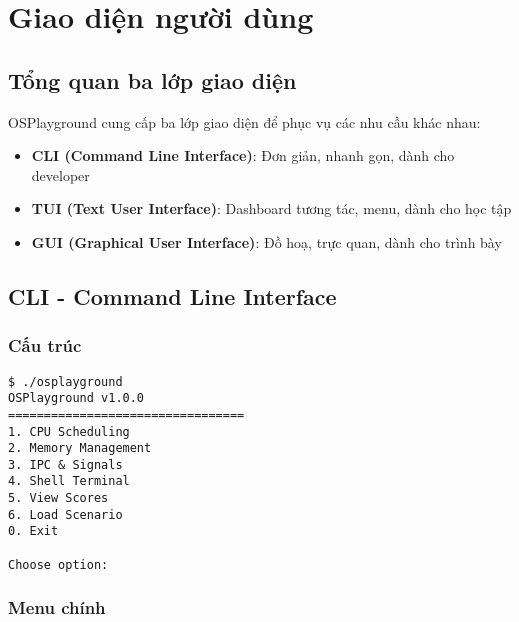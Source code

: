 
\chapter{Giao diện người dùng}
\label{ch:ui}

\section{Tổng quan ba lớp giao diện}

OSPlayground cung cấp ba lớp giao diện để phục vụ các nhu cầu khác nhau:

\begin{itemize}[leftmargin=1.5cm]
  \item \textbf{CLI (Command Line Interface)}: Đơn giản, nhanh gọn, dành cho developer
  \item \textbf{TUI (Text User Interface)}: Dashboard tương tác, menu, dành cho học tập
  \item \textbf{GUI (Graphical User Interface)}: Đồ hoạ, trực quan, dành cho trình bày
\end{itemize}

\section{CLI - Command Line Interface}

\subsection{Cấu trúc}

\begin{verbatim}
$ ./osplayground
OSPlayground v1.0.0
=================================
1. CPU Scheduling
2. Memory Management
3. IPC & Signals
4. Shell Terminal
5. View Scores
6. Load Scenario
0. Exit

Choose option: 
\end{verbatim}

\subsection{Menu chính}

